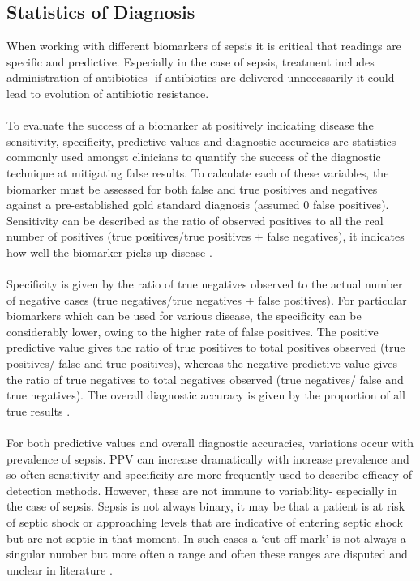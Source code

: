 \subsection{Statistics of Diagnosis}
When working with different biomarkers of sepsis it is critical that readings are specific and predictive. Especially in the case of sepsis, treatment includes administration of antibiotics- if antibiotics are delivered unnecessarily it could lead to evolution of antibiotic resistance.\\\\
To evaluate the success of a biomarker at positively indicating disease the sensitivity, specificity, predictive values and diagnostic accuracies are statistics commonly used amongst clinicians to quantify the success of the diagnostic technique at mitigating false results. To calculate each of these variables, the biomarker must be assessed for both false and true positives and negatives against a pre-established gold standard diagnosis (assumed 0 false positives). Sensitivity can be described as the ratio of observed positives to all the real number of positives (true positives/true positives + false negatives), it indicates how well the biomarker picks up disease \cite{kazmierczak1999statistical}. \\\\
Specificity is given by the ratio of true negatives observed to the actual number of negative cases (true negatives/true negatives + false positives). For particular biomarkers which can be used for various disease, the specificity can be considerably lower, owing to the higher rate of false positives. The positive predictive value gives the ratio of true positives to total positives observed (true positives/ false and true positives), whereas the negative predictive value gives the ratio of true negatives to total negatives observed (true negatives/ false and true negatives).  The overall diagnostic accuracy is given by the proportion of all true results \cite{christenson2007evidence}.\\\\
For both predictive values and overall diagnostic accuracies, variations occur with prevalence of sepsis. PPV can increase dramatically with increase prevalence and so often sensitivity and specificity are more frequently used to describe efficacy of detection methods. However, these are not immune to variability- especially in the case of sepsis. Sepsis is not always binary, it may be that a patient is at risk of septic shock or approaching levels that are indicative of entering septic shock but are not septic in that moment. In such cases a ‘cut off mark’ is not always a singular number but more often a range and often these ranges are disputed and unclear in literature \cite{xia2013translational}. \\\\

